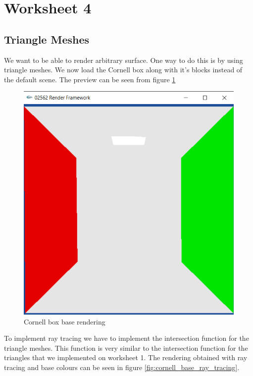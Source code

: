 \section{Worksheet 4}
\subsection{Triangle Meshes}
We want to be able to render arbitrary surface. One way to do this is by using triangle meshes. We now load the Cornell box along with it's blocks instead of the default scene. The preview can be seen from figure \ref{fig:cornell_base_rendering}
\begin{figure}[H]
	\centering
	\includegraphics[scale=\imagescale]{images/worksheet_4/part_1}
	\caption{Cornell box base rendering}
	\label{fig:cornell_base_rendering}
\end{figure}
To implement ray tracing we have to implement the intersection function for the triangle meshes. This function is very similar to the intersection function for the triangles that we implemented on worksheet 1. The rendering obtained with ray tracing and base colours can be seen in figure \ref{fig:cornell_base_ray_tracing}.
